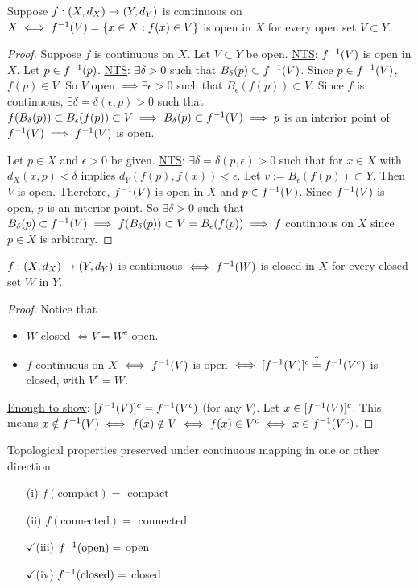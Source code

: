 \documentclass[]{article}
\begin{document}
\begin{theorem}
	Suppose $f:(X,d_X)\rightarrow(Y,d_Y)$ is continuous on $X \iff f^{-1}(V) = \left\{ x\in X : f(x)\in V \right\}$ is open in $X$ for every open set $V\subset Y$.
\end{theorem}
\begin{proof}
	\say{$\implies$} Suppose $f$ is continuous on $X$. Let $V\subset Y$ be open.
	\ul{\ul{NTS}}: $f^{-1}(V)$ is open in $X$.
	Let $p\in f^{-1}(p)$.
	\ul{\ul{NTS}}: $\exists\delta>0$ such that $B_\delta(p)\subset f^{-1}(V)$.
	Since $p\in f^{-1}(V)$, $f(p)\in V$.
	So $V$ open $\implies\exists\epsilon>0$ such that $B_\epsilon(f(p))\subset V$.
	Since $f$ is continuous, $\exists\delta=\delta(\epsilon,p)>0$ such that $f(B_\delta(p))\subset B_\epsilon(f(p))\subset V \implies B_\delta(p)\subset f^{-1}(V) \implies p$ is an interior point of $f^{-1}(V) \implies f^{-1}(V)$ is open.

	\say{$\Lla$} Let $p\in X$ and $\epsilon>0$ be given.
	\ul{NTS}: $\exists\delta=\delta(p,\epsilon)>0$ such that for $x\in X$ with $d_X(x,p)<\delta$ implies $d_Y(f(p),f(x))<\epsilon$.
	Let $v:=B_\epsilon(f(p))\subset Y$. Then $V$ is open. Therefore, $f^{-1}(V)$ is open in $X$ and $p\in f^{-1}(V)$.
	Since $f^{-1}(V)$ is open, $p$ is an interior point. So $\exists\delta>0$ such that $B_\delta(p)\subset f^{-1}(V) \implies f(B_\delta(p))\subset V = B_\epsilon(f(p)) \implies f$ continuous on $X$ since $p\in X$ is arbitrary.
\end{proof}
\begin{corollary}
	$f:(X,d_X)\rightarrow(Y,d_Y)$ is continuous $\iff f^{-1}(W)$ is closed in $X$ for every closed set $W$ in $Y$.
\end{corollary}
\begin{proof}
	Notice that 
	\begin{itemize}
		\item $W$ closed $\iff V=W^c$ open.
		\item $f$ continuous on $X\iff f^{-1}(V)$ is open $\iff [f^{-1}(V)]^c \overset{?}{=} f^{-1}(V^c)$ is closed, with $V^c=W$.
	\end{itemize}
	\ul{Enough to show}: $[f^{-1}(V)]^c = f^{-1}(V^c)$ (for any $V$).
	Let $x\in[f^{-1}(V)]^c$. This means $x\notin f^{-1}(V) \iff f(x)\notin V \iff f(x)\in V^c \iff x\in f^{-1}(V^c)$.
\end{proof}
\begin{remark}
	Topological properties preserved under continuous mapping in one or other direction.
	\begin{enumerate}
		\item[(i)] $f(\text{compact})= $ compact
		\item[(ii)] $f(\text{connected}) = $ connected
		\item[$\checkmark$(iii)] $f^{-1}(\text{open}) = $ open
		\item[$\checkmark$(iv)] $f^{-1}(\text{closed}) = $ closed
	\end{enumerate}
\end{remark}
\end{document}
